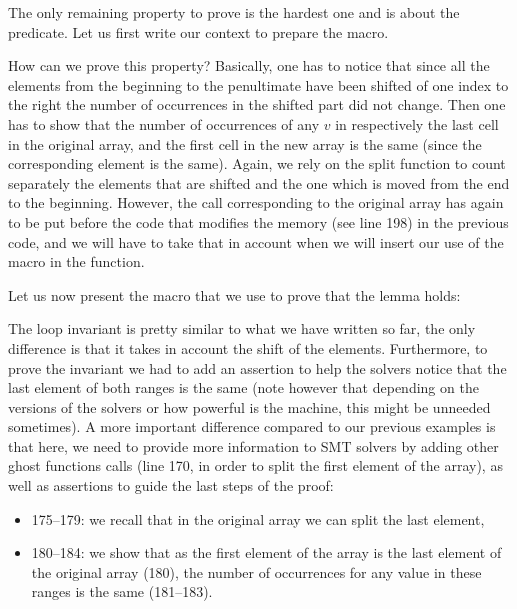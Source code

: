The only remaining property to prove is the hardest one and is about the
 predicate. Let us first write our context to prepare
the macro.




How can we prove this property? Basically, one has to notice that since all the
elements from the beginning to the penultimate have been shifted of one index
to the right the number of occurrences in the shifted part did not change. Then
one has to show that the number of occurrences of any $v$ in respectively the
last cell in the original array, and the first cell in the new array is the same
(since the corresponding element is the same). Again, we rely on the split
function to count separately the elements that are shifted and the one which is
moved from the end to the beginning. However, the call corresponding to the
original array has again to be put before the code that modifies the memory (see
line 198) in the previous code, and we will have to take that in account when we
will insert our use of the macro in the  function.


Let us now present the macro that we use to prove that the lemma holds:




The loop invariant is pretty similar to what we have written so far, the only
difference is that it takes in account the shift of the elements. Furthermore,
to prove the invariant we had to add an assertion to help the solvers notice
that the last element of both ranges is the same (note however that depending
on the versions of the solvers or how powerful is the machine, this might be
unneeded sometimes). A more important difference compared to our previous
examples is that here, we need to provide more information to SMT solvers by
adding other ghost functions calls (line 170, in order to split the first
element of the array), as well as assertions to guide the last steps of the
proof:


\begin{itemize}
\item 175--179: we recall that in the original array we can split the last
  element,
\item 180--184: we show that as the first element of the array is
  the last element of the original array (180), the number of occurrences for
  any value in these ranges is the same (181--183).
\end{itemize}



